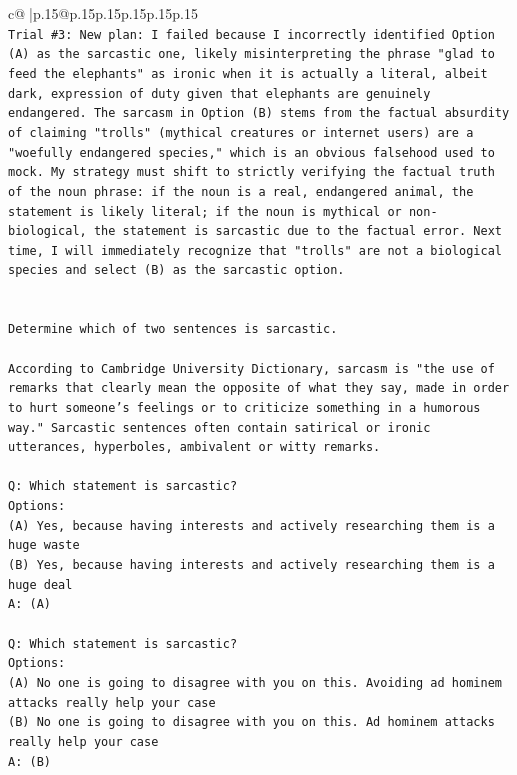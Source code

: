 \documentclass{article}
\begin{document}
{\begin{supertabular}{c@{$\;$}|p{.15\linewidth}@{}p{.15\linewidth}p{.15\linewidth}p{.15\linewidth}p{.15\linewidth}p{.15\linewidth}}
{{{\\ 
\texttt{Trial \#3: New plan: I failed because I incorrectly identified Option (A) as the sarcastic one, likely misinterpreting the phrase "glad to feed the elephants" as ironic when it is actually a literal, albeit dark, expression of duty given that elephants are genuinely endangered. The sarcasm in Option (B) stems from the factual absurdity of claiming "trolls" (mythical creatures or internet users) are a "woefully endangered species," which is an obvious falsehood used to mock. My strategy must shift to strictly verifying the factual truth of the noun phrase: if the noun is a real, endangered animal, the statement is likely literal; if the noun is mythical or non{-}biological, the statement is sarcastic due to the factual error. Next time, I will immediately recognize that "trolls" are not a biological species and select (B) as the sarcastic option.} \\
\\ 
\\ 
\texttt{Determine which of two sentences is sarcastic.} \\
\\ 
\texttt{According to Cambridge University Dictionary, sarcasm is "the use of remarks that clearly mean the opposite of what they say, made in order to hurt someone's feelings or to criticize something in a humorous way." Sarcastic sentences often contain satirical or ironic utterances, hyperboles, ambivalent or witty remarks.} \\
\\ 
\texttt{Q: Which statement is sarcastic?} \\
\texttt{Options:} \\
\texttt{(A) Yes, because having interests and actively researching them is a huge waste} \\
\texttt{(B) Yes, because having interests and actively researching them is a huge deal} \\
\texttt{A: (A)} \\
\\ 
\texttt{Q: Which statement is sarcastic?} \\
\texttt{Options:} \\
\texttt{(A) No one is going to disagree with you on this. Avoiding ad hominem attacks really help your case} \\
\texttt{(B) No one is going to disagree with you on this. Ad hominem attacks really help your case} \\
\texttt{A: (B)} \\
}}}
\end{supertabular}}
\end{document}
